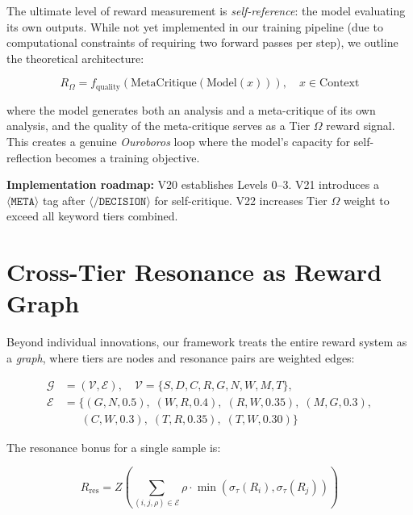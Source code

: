 \documentclass{article}
\begin{document}
The ultimate level of reward measurement is \emph{self-reference}: the model evaluating its own outputs. While not yet implemented in our training pipeline (due to computational constraints of requiring two forward passes per step), we outline the theoretical architecture:

\begin{equation}
    R_{\Omega} = f_{\text{quality}}(\text{MetaCritique}(\text{Model}(x))), \quad x \in \text{Context}
\end{equation}

where the model generates both an analysis and a meta-critique of its own analysis, and the quality of the meta-critique serves as a Tier $\Omega$ reward signal. This creates a genuine \emph{Ouroboros} loop where the model's capacity for self-reflection becomes a training objective.

\textbf{Implementation roadmap:} V20 establishes Levels 0--3. V21 introduces a $\langle\texttt{META}\rangle$ tag after $\langle\texttt{/DECISION}\rangle$ for self-critique. V22 increases Tier $\Omega$ weight to exceed all keyword tiers combined.

\section{Cross-Tier Resonance as Reward Graph}
\label{sec:resonance}

Beyond individual innovations, our framework treats the entire reward system as a \emph{graph}, where tiers are nodes and resonance pairs are weighted edges:

\begin{align}
    \mathcal{G} &= (\mathcal{V}, \mathcal{E}), \quad \mathcal{V} = \{S, D, C, R, G, N, W, M, T\}, \nonumber \\
    \mathcal{E} &= \{(G,N,0.5),\; (W,R,0.4),\; (R,W,0.35),\; (M,G,0.3), \nonumber \\
    &\quad\;\; (C,W,0.3),\; (T,R,0.35),\; (T,W,0.30)\}
\end{align}

The resonance bonus for a single sample is:

\begin{equation}
    R_{\text{res}} = Z\left(\sum_{(i,j,\rho) \in \mathcal{E}} \rho \cdot \min\left(\sigma_{\tau}(R_i), \sigma_{\tau}(R_j)\right)\right)
\end{equation}
\end{document}
